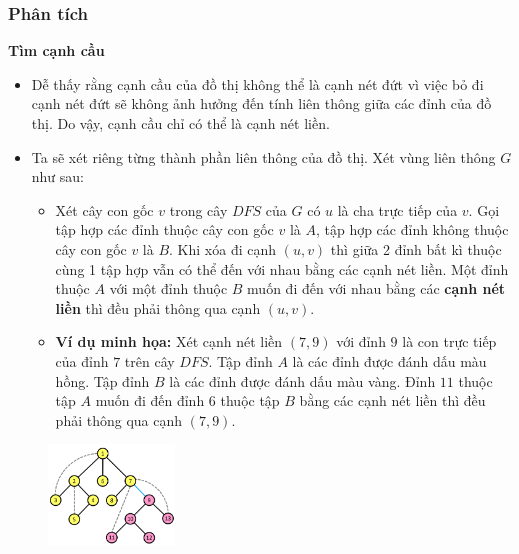 \documentclass{article}
\begin{document}
\subsubsection*{Phân tích}

\textbf{Tìm cạnh cầu}
\begin{itemize}
    \item Dễ thấy rằng cạnh cầu của đồ thị không thể là cạnh nét đứt vì việc bỏ đi cạnh nét đứt sẽ không ảnh hưởng đến tính liên thông giữa các đỉnh của đồ thị. Do vậy, cạnh cầu chỉ có thể là cạnh nét liền.
    \item Ta sẽ xét riêng từng thành phần liên thông của đồ thị. Xét vùng liên thông $G$ như sau:
    \begin{itemize}
        \item Xét cây con gốc $v$ trong cây $DFS$ của $G$ có $u$ là cha trực tiếp của $v$. Gọi tập hợp các đỉnh thuộc cây con gốc $v$ là $A$, tập hợp các đỉnh không thuộc cây con gốc $v$ là $B$. Khi xóa đi cạnh $(u, v)$ thì giữa 2 đỉnh bất kì thuộc cùng 1 tập hợp vẫn có thể đến với nhau bằng các cạnh nét liền. Một đỉnh thuộc $A$ với một đỉnh thuộc $B$ muốn đi đến với nhau bằng các \textbf{cạnh nét liền} thì đều phải thông qua cạnh $(u, v)$.
        \item \textbf{Ví dụ minh họa:} Xét cạnh nét liền $(7, 9)$ với đỉnh $9$ là con trực tiếp của đỉnh $7$ trên cây $DFS$. Tập đỉnh $A$ là các đỉnh được đánh dấu màu hồng. Tập đỉnh $B$ là các đỉnh được đánh dấu màu vàng. Đỉnh $11$ thuộc tập $A$ muốn đi đến đỉnh $6$ thuộc tập $B$ bằng các cạnh nét liền thì đều phải thông qua cạnh $(7, 9)$.
    \end{itemize}
\end{itemize}

\begin{figure}[h]
    \centering
    \includegraphics[width=0.3\textwidth]{img/b4/Depth-First-Search-Tree_img6.png}
\end{figure}
\end{document}
